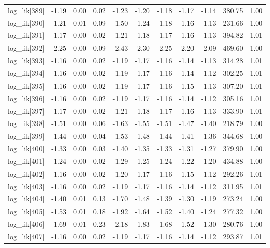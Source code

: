 \begin{table}[ht]
\begin{tabular}{rrrrrrrrrrr}
  log\_lik[389] & -1.19 & 0.00 & 0.02 & -1.23 & -1.20 & -1.18 & -1.17 & -1.14 & 380.75 & 1.00 \\ 
  log\_lik[390] & -1.21 & 0.01 & 0.09 & -1.50 & -1.24 & -1.18 & -1.16 & -1.13 & 231.66 & 1.00 \\ 
  log\_lik[391] & -1.17 & 0.00 & 0.02 & -1.21 & -1.18 & -1.17 & -1.16 & -1.13 & 394.82 & 1.01 \\ 
  log\_lik[392] & -2.25 & 0.00 & 0.09 & -2.43 & -2.30 & -2.25 & -2.20 & -2.09 & 469.60 & 1.00 \\ 
  log\_lik[393] & -1.16 & 0.00 & 0.02 & -1.19 & -1.17 & -1.16 & -1.14 & -1.13 & 314.28 & 1.01 \\ 
  log\_lik[394] & -1.16 & 0.00 & 0.02 & -1.19 & -1.17 & -1.16 & -1.14 & -1.12 & 302.25 & 1.01 \\ 
  log\_lik[395] & -1.16 & 0.00 & 0.02 & -1.19 & -1.17 & -1.16 & -1.15 & -1.13 & 307.20 & 1.01 \\ 
  log\_lik[396] & -1.16 & 0.00 & 0.02 & -1.19 & -1.17 & -1.16 & -1.14 & -1.12 & 305.16 & 1.01 \\ 
  log\_lik[397] & -1.17 & 0.00 & 0.02 & -1.21 & -1.18 & -1.17 & -1.16 & -1.13 & 333.90 & 1.01 \\ 
  log\_lik[398] & -1.51 & 0.00 & 0.06 & -1.63 & -1.55 & -1.51 & -1.47 & -1.40 & 218.79 & 1.00 \\ 
  log\_lik[399] & -1.44 & 0.00 & 0.04 & -1.53 & -1.48 & -1.44 & -1.41 & -1.36 & 344.68 & 1.00 \\ 
  log\_lik[400] & -1.33 & 0.00 & 0.03 & -1.40 & -1.35 & -1.33 & -1.31 & -1.27 & 379.90 & 1.00 \\ 
  log\_lik[401] & -1.24 & 0.00 & 0.02 & -1.29 & -1.25 & -1.24 & -1.22 & -1.20 & 434.88 & 1.00 \\ 
  log\_lik[402] & -1.16 & 0.00 & 0.02 & -1.20 & -1.17 & -1.16 & -1.15 & -1.12 & 292.26 & 1.01 \\ 
  log\_lik[403] & -1.16 & 0.00 & 0.02 & -1.19 & -1.17 & -1.16 & -1.14 & -1.12 & 311.95 & 1.01 \\ 
  log\_lik[404] & -1.40 & 0.01 & 0.13 & -1.70 & -1.48 & -1.39 & -1.30 & -1.19 & 273.24 & 1.00 \\ 
  log\_lik[405] & -1.53 & 0.01 & 0.18 & -1.92 & -1.64 & -1.52 & -1.40 & -1.24 & 277.32 & 1.00 \\ 
  log\_lik[406] & -1.69 & 0.01 & 0.23 & -2.18 & -1.83 & -1.68 & -1.52 & -1.30 & 280.76 & 1.00 \\ 
  log\_lik[407] & -1.16 & 0.00 & 0.02 & -1.19 & -1.17 & -1.16 & -1.14 & -1.12 & 293.87 & 1.01 \\ 

\end{tabular}
\end{table}
